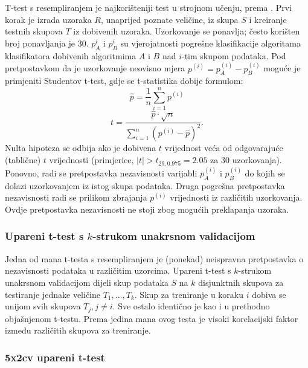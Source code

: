 T-test s resempliranjem je najkorišteniji test u strojnom učenju, prema \citep{dietterich1998approximate}. Prvi korak je izrada uzoraka $R$, unaprijed poznate veličine, iz skupa $S$ i kreiranje testnih skupova $T$ iz dobivenih uzoraka. Uzorkovanje se ponavlja; često korišten broj ponavljanja je 30. $p_{A}^{i}$ i $p_{B}^{i}$ su vjerojatnosti pogrešne klasifikacije algoritama klasifikatora dobivenih algoritmima $A$ i $B$ nad $i$-tim skupom podataka. Pod pretpostavkom da je uzorkovanje neovisno mjera $p^{(i)} = p^{(i)}_{A} - p_{B}^{(i)}$ moguće je primjeniti Studentov t-test, gdje se t-statistika dobije formulom:
\begin{equation}
\hat{p} = \frac{1}{n}\sum_{i=1}^{n} p^{(i)}
\end{equation}
\begin{equation}
t = \frac{\hat{p} \cdot \sqrt{n}}{\sum_{i=1}^{n} (p^{(i)}-\hat{p})^2}.
\end{equation}
Nulta hipoteza se odbija ako je dobivena $t$ vrijednost veća od odgovarajuće (tablične) $t$ vrijednosti (primjerice, $|t|>t_{29,0.975} = 2.05$ za 30 uzorkovanja). Ponovno, radi se pretpostavka nezavisnosti varijabli $p_{A}^{(i)}$ i $p_{B}^{(i)}$ do kojih se dolazi uzorkovanjem iz istog skupa podataka. Druga pogrešna pretpostavka nezavisnosti radi se prilikom zbrajanja $p^{(i)}$ vrijednosti iz različitih uzorkovanja. Ovdje pretpostavka nezavisnosti ne stoji zbog mogućih preklapanja uzoraka.

\subsubsection{Upareni t-test s $k$-strukom unakrsnom validacijom}

Jedna od mana t-testa s resempliranjem je (ponekad) neispravna pretpostavka o nezavisnosti podataka u različitim uzorcima. Upareni t-test s $k$-strukom unakrsnom validacijom dijeli skup podataka $S$ na $k$ disjunktnih skupova za testiranje jednake veličine $T_1, \dots ,T_k$. Skup za treniranje u koraku $i$ dobiva se unijom svih skupova $T_j, j\neq i$. Sve ostalo identično je kao i u prethodno objašnjenom t-testu. Prema \citep{dietterich1998approximate} jedina mana ovog testa je visoki korelacijski faktor između različitih skupova za treniranje. 

\subsubsection{5x2cv upareni t-test}

